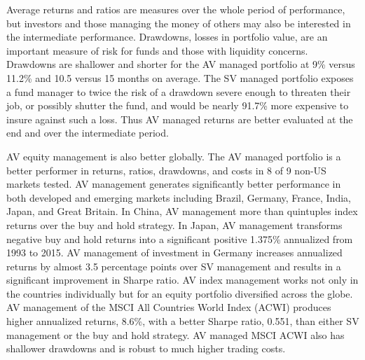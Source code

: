 Average returns and ratios are measures over the whole period of performance, but investors and those managing the money of others may also be interested in the intermediate performance. Drawdowns, losses in portfolio value, are an important measure of risk for funds and those with liquidity concerns. Drawdowns are shallower and shorter for the AV managed portfolio at 9\% versus 11.2\% and 10.5 versus 15 months on average. %
The SV managed portfolio exposes a fund manager to twice the risk of a drawdown severe enough to threaten their job, or possibly shutter the fund, and would be nearly 91.7\% more expensive to insure against such a loss. Thus AV managed returns are better evaluated at the end and over the intermediate period.

AV equity management is also better globally. The AV managed portfolio is a better performer in returns, ratios, drawdowns, and costs in 8 of 9 non-US markets tested. AV management generates significantly better performance in both developed and emerging markets including Brazil, Germany, France, India, Japan, and Great Britain. In China, AV management more than quintuples index returns over the buy and hold strategy. In Japan, AV management transforms negative buy and hold returns into a significant positive 1.375\% annualized from 1993 to 2015. AV management of investment in Germany increases annualized returns by almost 3.5 percentage points over SV management and results in a significant improvement in Sharpe ratio. AV index management works not only in the countries individually but for an equity portfolio diversified across the globe. AV management of the MSCI All Countries World Index (ACWI) produces higher annualized returns, 8.6\%, with a better Sharpe ratio, 0.551, than either SV management or the buy and hold strategy. AV managed MSCI ACWI also has shallower drawdowns and is robust to much higher trading costs. 

